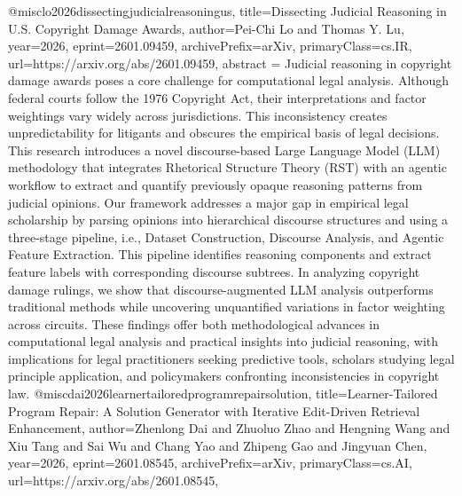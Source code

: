 {}@misc{lo2026dissectingjudicialreasoningus,
      title={Dissecting Judicial Reasoning in U.S. Copyright Damage Awards}, 
      author={Pei-Chi Lo and Thomas Y. Lu},
      year={2026},
      eprint={2601.09459},
      archivePrefix={arXiv},
      primaryClass={cs.IR},
      url={https://arxiv.org/abs/2601.09459},
      abstract = {Judicial reasoning in copyright damage awards poses a core challenge for computational legal analysis. Although federal courts follow the 1976 Copyright Act, their interpretations and factor weightings vary widely across jurisdictions. This inconsistency creates unpredictability for litigants and obscures the empirical basis of legal decisions. This research introduces a novel discourse-based Large Language Model (LLM) methodology that integrates Rhetorical Structure Theory (RST) with an agentic workflow to extract and quantify previously opaque reasoning patterns from judicial opinions. Our framework addresses a major gap in empirical legal scholarship by parsing opinions into hierarchical discourse structures and using a three-stage pipeline, i.e., Dataset Construction, Discourse Analysis, and Agentic Feature Extraction. This pipeline identifies reasoning components and extract feature labels with corresponding discourse subtrees. In analyzing copyright damage rulings, we show that discourse-augmented LLM analysis outperforms traditional methods while uncovering unquantified variations in factor weighting across circuits. These findings offer both methodological advances in computational legal analysis and practical insights into judicial reasoning, with implications for legal practitioners seeking predictive tools, scholars studying legal principle application, and policymakers confronting inconsistencies in copyright law.}
}@misc{dai2026learnertailoredprogramrepairsolution,
      title={Learner-Tailored Program Repair: A Solution Generator with Iterative Edit-Driven Retrieval Enhancement}, 
      author={Zhenlong Dai and Zhuoluo Zhao and Hengning Wang and Xiu Tang and Sai Wu and Chang Yao and Zhipeng Gao and Jingyuan Chen},
      year={2026},
      eprint={2601.08545},
      archivePrefix={arXiv},
      primaryClass={cs.AI},
      url={https://arxiv.org/abs/2601.08545},
}
